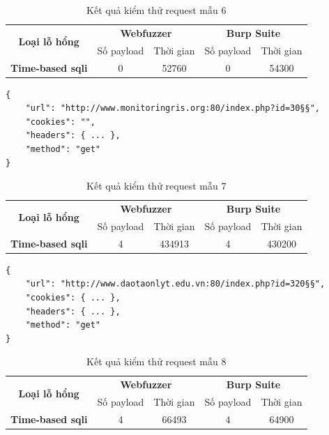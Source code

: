\FloatBarrier
\begin{table}[ht]
    \centering
    \caption{Kết quả kiểm thử request mẫu 6}
    \label{tab:testing-result-6}
    \begin{tabular}[ht]{ccccc}
        \toprule[1pt]\midrule[0.3pt]
            \multirow{2}{*}{\textbf{Loại lỗ hổng}}&\multicolumn{2}{c}{\textbf{Webfuzzer}}&\multicolumn{2}{c}{\textbf{Burp Suite}}\\
            \cmidrule(lr){2-3}\cmidrule(lr){4-5}{}&Số payload&Thời gian&Số payload&Thời gian\\
        \midrule[0.3pt]
            \textbf{Time-based \acrshort{sqli}}&0&52760&0&54300\\
        \midrule[0.3pt]\bottomrule[1pt]
    \end{tabular}
\end{table}
\FloatBarrier
\begin{lstlisting}[style=ES6, label={lst:base-request-7}, caption={Request mẫu 7 có lỗ hổng time-based \acrshort{sqli}}]
{
    "url": "http://www.monitoringris.org:80/index.php?id=30§§",
    "cookies": "",
    "headers": { ... },
    "method": "get"
}
\end{lstlisting}
\FloatBarrier
\begin{table}[ht]
    \centering
    \caption{Kết quả kiểm thử request mẫu 7}
    \label{tab:testing-result-7}
    \begin{tabular}[ht]{ccccc}
        \toprule[1pt]\midrule[0.3pt]
            \multirow{2}{*}{\textbf{Loại lỗ hổng}}&\multicolumn{2}{c}{\textbf{Webfuzzer}}&\multicolumn{2}{c}{\textbf{Burp Suite}}\\
            \cmidrule(lr){2-3}\cmidrule(lr){4-5}{}&Số payload&Thời gian&Số payload&Thời gian\\
        \midrule[0.3pt]
            \textbf{Time-based \acrshort{sqli}}&4&434913&4&430200\\
        \midrule[0.3pt]\bottomrule[1pt]
    \end{tabular}
\end{table}
\FloatBarrier
\begin{lstlisting}[style=ES6, label={lst:base-request-8}, caption={Request mẫu 8 có lỗ hổng time-based \acrshort{sqli}}]
{
    "url": "http://www.daotaonlyt.edu.vn:80/index.php?id=320§§",
    "cookies": { ... },
    "headers": { ... },
    "method": "get"
}
\end{lstlisting}
\FloatBarrier
\begin{table}[ht]
    \centering
    \caption{Kết quả kiểm thử request mẫu 8}
    \label{tab:testing-result-8}
    \begin{tabular}[ht]{ccccc}
        \toprule[1pt]\midrule[0.3pt]
            \multirow{2}{*}{\textbf{Loại lỗ hổng}}&\multicolumn{2}{c}{\textbf{Webfuzzer}}&\multicolumn{2}{c}{\textbf{Burp Suite}}\\
            \cmidrule(lr){2-3}\cmidrule(lr){4-5}{}&Số payload&Thời gian&Số payload&Thời gian\\
        \midrule[0.3pt]
            \textbf{Time-based \acrshort{sqli}}&4&66493&4&64900\\
        \midrule[0.3pt]\bottomrule[1pt]
    \end{tabular}
\end{table}
